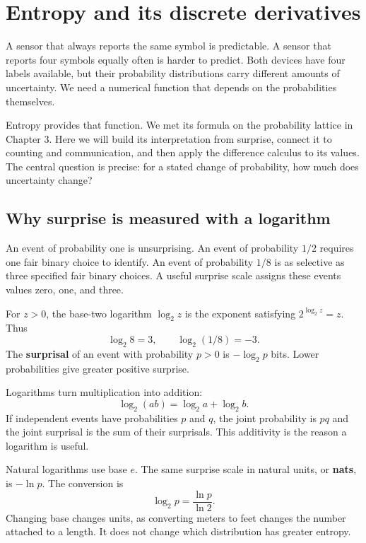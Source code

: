 \documentclass[11pt,oneside,openany]{book}
\theoremstyle{definition}
\theoremstyle{remark}
\numberwithin{equation}{chapter}
\begin{document}
\FloatBarrier

\chapter{Entropy and its discrete derivatives}
A sensor that always reports the same symbol is predictable. A sensor that reports four symbols equally often is harder to predict. Both devices have four labels available, but their probability distributions carry different amounts of uncertainty. We need a numerical function that depends on the probabilities themselves.

Entropy provides that function. We met its formula on the probability lattice in Chapter 3. Here we will build its interpretation from surprise, connect it to counting and communication, and then apply the difference calculus to its values. The central question is precise: for a stated change of probability, how much does uncertainty change?

\section{Why surprise is measured with a logarithm}\label{ch05-why-surprise-is-measured-with-a-logarithm}

An event of probability one is unsurprising. An event of probability \(1/2\) requires one fair binary choice to identify. An event of probability \(1/8\) is as selective as three specified fair binary choices. A useful surprise scale assigns these events values zero, one, and three.

For \(z>0\), the base-two logarithm \(\log_2 z\) is the exponent satisfying \(2^{\log_2z}=z\). Thus \[\log_2 8=3,\qquad \log_2(1/8)=-3.\] The \textbf{surprisal} of an event with probability \(p>0\) is \(-\log_2p\) bits. Lower probabilities give greater positive surprise.

Logarithms turn multiplication into addition: \[\log_2(ab)=\log_2a+\log_2b.\] If independent events have probabilities \(p\) and \(q\), the joint probability is \(pq\) and the joint surprisal is the sum of their surprisals. This additivity is the reason a logarithm is useful.

Natural logarithms use base \(e\). The same surprise scale in natural units, or \textbf{nats}, is \(-\ln p\). The conversion is \[\log_2p=\frac{\ln p}{\ln2}.\] Changing base changes units, as converting meters to feet changes the number attached to a length. It does not change which distribution has greater entropy.
\end{document}
